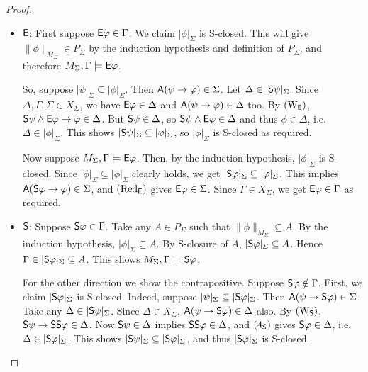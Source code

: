 \begin{proof}
    \begin{itemize}
    \item $\E$: First suppose $\E\phi \in \Gamma$. We claim $|\phi|_\Sigma$ is
    S-closed. This will give $\|\phi\|_{M_\Sigma} \in P_\Sigma$ by the
    induction hypothesis and definition of $P_\Sigma$, and therefore $M_\Sigma,
    \Gamma \models \E\phi$.

    So, suppose $|\psi|_\Sigma \subseteq |\phi|_\Sigma$. Then
    $\A(\psi \limplies \phi) \in \Sigma$. Let $\Delta \in
    |\S\psi|_\Sigma$. Since $\Delta, \Gamma, \Sigma \in X_\Sigma$,
    we have $\E\phi \in \Delta$ and $\A(\psi \limplies \phi) \in
    \Delta$ too. By $\weakeningE$, $\S\psi \land \E\phi \limplies
    \phi \in \Delta$. But $\S\psi \in \Delta$, so $\S\psi \land
    \E\phi \in \Delta$ and thus $\phi \in \Delta$, i.e.  $\Delta
    \in |\phi|_\Sigma$. This shows $|\S\psi|_\Sigma \subseteq
    |\phi|_\Sigma$, so $|\phi|_\Sigma$ is S-closed as required.

    Now suppose $M_\Sigma, \Gamma \models \E\phi$. Then, by the
    induction hypothesis, $|\phi|_\Sigma$ is S-closed. Since
    $|\phi|_\Sigma \subseteq |\phi|_\Sigma$ clearly holds, we get
    $|\S\phi|_\Sigma \subseteq |\phi|_\Sigma$. This implies
    $\A(\S\phi \limplies \phi) \in \Sigma$, and $\redE$ gives
    $\E\phi \in \Sigma$. Since $\Gamma \in X_\Sigma$, we get
    $\E\phi \in \Gamma$ as required.

    \item $\S$: Suppose $\S\phi \in \Gamma$. Take any $A \in P_\Sigma$
    such that $\|\phi\|_{M_\Sigma} \subseteq A$. By the induction
    hypothesis, $|\phi|_\Sigma \subseteq A$. By S-closure of $A$,
    $|\S\phi|_\Sigma \subseteq A$. Hence $\Gamma \in
    |\S\phi|_\Sigma \subseteq A$. This shows $M_\Sigma, \Gamma
    \models \S\phi$.

    For the other direction we show the contrapositive. Suppose
    $\S\phi \notin \Gamma$. First, we claim $|\S\phi|_\Sigma$ is
    S-closed. Indeed, suppose $|\psi|_\Sigma \subseteq
    |\S\phi|_\Sigma$. Then $\A(\psi \limplies \S\phi) \in \Sigma$.
    Take any $\Delta \in |\S\psi|_\Sigma$. Since $\Delta \in
    X_\Sigma$, $\A(\psi \limplies \S\phi) \in \Delta$ also. By
    $\weakeningS$, $\S\psi \limplies \S\S\phi \in \Delta$.  Now
    $\S\psi \in \Delta$ implies $\S\S\phi \in \Delta$, and
    $\foursoundness$ gives $\S\phi \in \Delta$, i.e.  $\Delta \in
    |\S\phi|_\Sigma$. This shows $|\S\psi|_\Sigma \subseteq
    |\S\phi|_\Sigma$, and thus $|\S\phi|_\Sigma$ is S-closed.


\end{itemize}
\end{proof}
